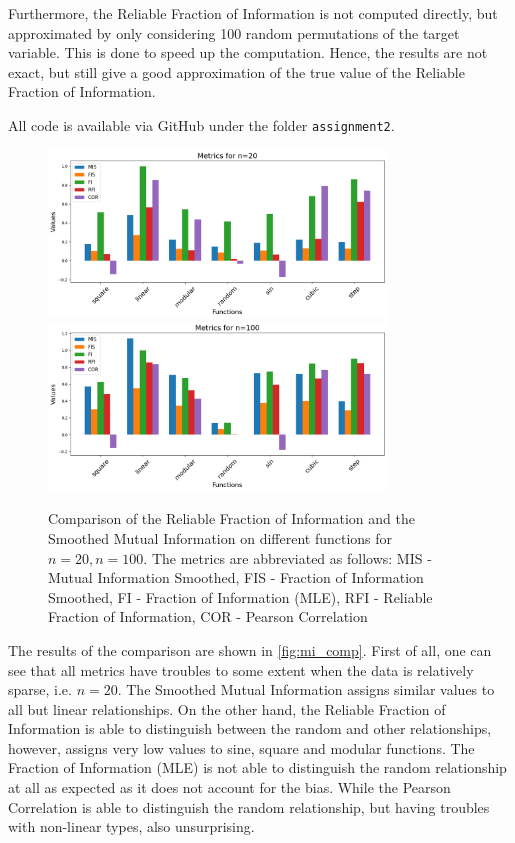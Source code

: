 \documentclass{article}
\begin{document}
Furthermore, the Reliable Fraction of Information is not computed directly, but approximated by only considering 100 random permutations of the target variable. This is done to speed up the computation. Hence, the results are not exact, but still give a good approximation of the true value of the Reliable Fraction of Information. 

All code is available via GitHub \cite{src} under the folder \texttt{assignment2}.

\begin{figure}[h]
    \centering
    \includegraphics[width=0.8\textwidth]{images/n20eps03.png}
    \includegraphics[width=0.8\textwidth]{images/n100eps03.png}
    \caption{Comparison of the Reliable Fraction of Information and the Smoothed Mutual Information on different functions for $n=20, n=100$. The metrics are abbreviated as follows: MIS - Mutual Information Smoothed, FIS - Fraction of Information Smoothed, FI - Fraction of Information (MLE), RFI - Reliable Fraction of Information, COR - Pearson Correlation}
    \label{fig:mi_comp}
\end{figure}

The results of the comparison are shown in \autoref{fig:mi_comp}. First of all, one can see that all metrics have troubles to some extent when the data is relatively sparse, i.e. $n=20$. The Smoothed Mutual Information assigns similar values to all but linear relationships. On the other hand, the Reliable Fraction of Information is able to distinguish between the random and other relationships, however, assigns very low values to sine, square and modular functions. The Fraction of Information (MLE) is not able to distinguish the random relationship at all as expected as it does not account for the bias. While the Pearson Correlation is able to distinguish the random relationship, but having troubles with non-linear types, also unsurprising.
\end{document}

